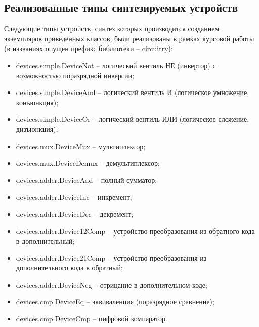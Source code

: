 \documentclass[document.tex]{subfiles}
\begin{document}
\subsection{Реализованные типы синтезируемых устройств}
Следующие типы устройств, синтез которых производится созданием экземпляров
приведенных классов, были реализованы в рамках курсовой работы (в
названиях опущен префикс библиотеки -- circuitry):
\begin{itemize}[noitemsep]
  \item devices.simple.DeviceNot -- логический вентиль НЕ (инвертор) с
  возможностью поразрядной инверсии;
  \item devices.simple.DeviceAnd -- логический вентиль И (логическое умножение,
  конъюнкция);
  \item devices.simple.DeviceOr -- логический вентиль ИЛИ (логическое сложение,
  дизъюнкция);
  \item devices.mux.DeviceMux -- мультиплексор;
  \item devices.mux.DeviceDemux -- демультиплексор;
  \item devices.adder.DeviceAdd -- полный сумматор;
  \item devices.adder.DeviceInc -- инкремент;
  \item devices.adder.DeviceDec -- декремент;
  \item devices.adder.Device12Comp -- устройство преобразования из обратного
  кода в дополнительный;
  \item devices.adder.Device21Comp -- устройство преобразования из
  дополнительного кода в обратный;
  \item devices.adder.DeviceNeg -- отрицание в дополнительном коде;
  \item devices.cmp.DeviceEq -- эквиваленция (поразрядное сравнение);
  \item devices.cmp.DeviceCmp -- цифровой компаратор.
\end{itemize}

\clearpage
\end{document}
